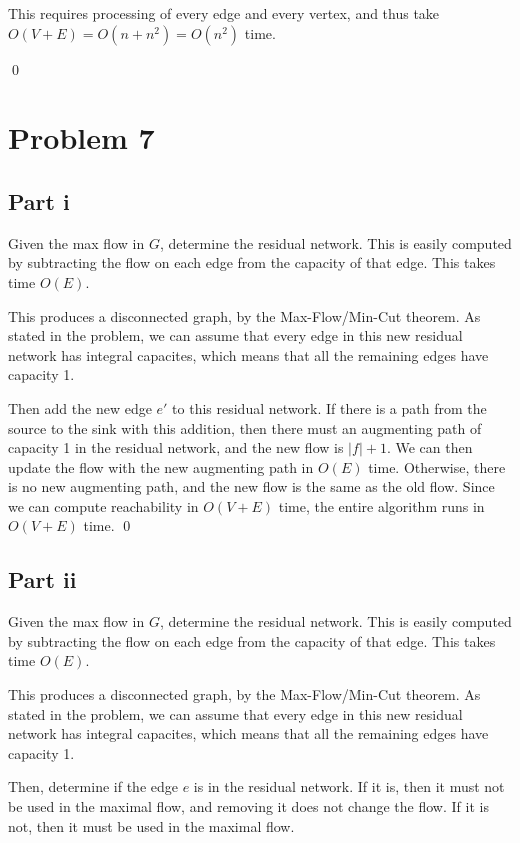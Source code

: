 \documentclass[twoside]{amsart}
\begin{document}
This requires processing of every edge and every vertex, and thus take
$O(V+E) = O(n+n^2) = O(n^2)$ time.

\qed

\section*{Problem 7}

\subsection*{Part i}

Given the max flow in $G$, determine the residual network.  This is
easily computed by subtracting the flow on each edge from the capacity
of that edge.  This takes time $O(E)$.  

This produces a disconnected graph, by the Max-Flow/Min-Cut theorem.
As stated in the problem, we can assume that every edge in this new
residual network has integral capacites, which means that all the
remaining edges have capacity 1.

Then add the new edge $e'$ to this residual network.  If there is a
path from the source to the sink with this addition, then there must
an augmenting path of capacity 1 in the residual network, and the new
flow is $|f| + 1$. We can then update the flow with the new augmenting
path in $O(E)$ time.  Otherwise, there is no new augmenting path, and
the new flow is the same as the old flow. Since we can compute
reachability in $O(V+E)$ time, the entire algorithm runs in $O(V+E)$
time. \qed


\subsection*{Part ii}

Given the max flow in $G$, determine the residual network.  This is
easily computed by subtracting the flow on each edge from the capacity
of that edge.  This takes time $O(E)$.  

This produces a disconnected graph, by the Max-Flow/Min-Cut theorem.
As stated in the problem, we can assume that every edge in this new
residual network has integral capacites, which means that all the
remaining edges have capacity 1.

Then, determine if the edge $e$ is in the residual network.  If it is,
then it must not be used in the maximal flow, and removing it does not
change the flow.  If it is not, then it must be used in the maximal
flow.  
\end{document}
